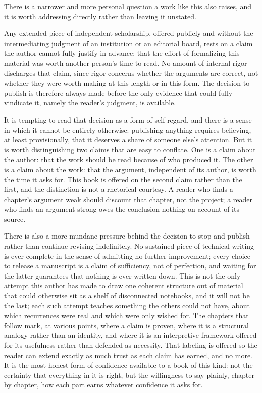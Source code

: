 \documentclass[11pt,fleqn]{book}
\numberwithin{equation}{chapter}
\theoremstyle{plain}
\theoremstyle{definition}
\theoremstyle{remark}
\begin{document}
There is a narrower and more personal question a work like this also raises, and it is worth addressing directly rather than leaving it unstated.

Any extended piece of independent scholarship, offered publicly and without the intermediating judgment of an institution or an editorial board, rests on a claim the author cannot fully justify in advance: that the effort of formalizing this material was worth another person's time to read. No amount of internal rigor discharges that claim, since rigor concerns whether the arguments are correct, not whether they were worth making at this length or in this form. The decision to publish is therefore always made before the only evidence that could fully vindicate it, namely the reader's judgment, is available.

It is tempting to read that decision as a form of self-regard, and there is a sense in which it cannot be entirely otherwise: publishing anything requires believing, at least provisionally, that it deserves a share of someone else's attention. But it is worth distinguishing two claims that are easy to conflate. One is a claim about the author: that the work should be read because of who produced it. The other is a claim about the work: that the argument, independent of its author, is worth the time it asks for. This book is offered on the second claim rather than the first, and the distinction is not a rhetorical courtesy. A reader who finds a chapter's argument weak should discount that chapter, not the project; a reader who finds an argument strong owes the conclusion nothing on account of its source.

There is also a more mundane pressure behind the decision to stop and publish rather than continue revising indefinitely. No sustained piece of technical writing is ever complete in the sense of admitting no further improvement; every choice to release a manuscript is a claim of sufficiency, not of perfection, and waiting for the latter guarantees that nothing is ever written down. This is not the only attempt this author has made to draw one coherent structure out of material that could otherwise sit as a shelf of disconnected notebooks, and it will not be the last; each such attempt teaches something the others could not have, about which recurrences were real and which were only wished for. The chapters that follow mark, at various points, where a claim is proven, where it is a structural analogy rather than an identity, and where it is an interpretive framework offered for its usefulness rather than defended as necessity. That labeling is offered so the reader can extend exactly as much trust as each claim has earned, and no more. It is the most honest form of confidence available to a book of this kind: not the certainty that everything in it is right, but the willingness to say plainly, chapter by chapter, how each part earns whatever confidence it asks for.
\end{document}
